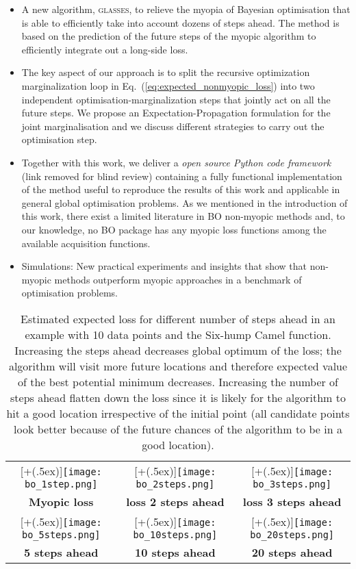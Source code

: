 \documentclass[twoside]{article}
\newcommand{\acr}[1]{\textsc{#1}\xspace}
\newcommand{\us}{\acr{glasses}}
\newcommand*{\addheight}[2][.5ex]{%
  \raisebox{0pt}[\dimexpr\height+(#1)\relax]{#2}%
}
\begin{document}
\begin{itemize}
\item A new algorithm, \us, to relieve the myopia of Bayesian optimisation that is able to efficiently take into account dozens of steps ahead. The method is based on the prediction of the future steps of the myopic algorithm to efficiently integrate out a long-side loss. 
\item The key aspect of our approach is to split the recursive optimization marginalization loop in Eq.~(\ref{eq:expected_nonmyopic_loss}) into two independent optimisation-marginalization steps that jointly act on all the future steps. We propose an Expectation-Propagation formulation for the joint marginalisation and we discuss different strategies to carry out the optimisation step.
\item Together with this work, we deliver a \emph{open source Python code framework} (link removed for blind review) containing a fully functional  implementation of the method useful to reproduce the results of this work and applicable in general global optimisation problems. As we mentioned in the introduction of this work, there exist a limited literature in BO non-myopic methods and, to our knowledge, no BO package has any myopic loss functions among the available acquisition functions. 
\item Simulations: New practical experiments and insights that show that non-myopic methods outperform myopic approaches in a benchmark of optimisation problems. 
\end{itemize}



\begin{table*}[t!]
\begin{tabular}{ccc}
      \addheight{\texttt{[image: bo\_1step.png]}} &
      \addheight{\texttt{[image: bo\_2steps.png]}}  &
      \addheight{\texttt{[image: bo\_3steps.png]}}\\
      \small \textbf{Myopic loss} &  \small \textbf{loss 2 steps ahead} & \small \textbf{loss 3 steps ahead} \\
      \addheight{\texttt{[image: bo\_5steps.png]}} &
      \addheight{\texttt{[image: bo\_10steps.png]}}  &
      \addheight{\texttt{[image: bo\_20steps.png]}}\\
      \small \small \textbf{5 steps ahead} & \small \textbf{10 steps ahead} & \small \textbf{20 steps ahead} \\
\end{tabular}\caption{Estimated expected loss for different number of steps ahead in an example with 10 data points and the Six-hump Camel function. Increasing the steps ahead decreases global optimum of the loss; the algorithm will visit more future locations and therefore expected value of the best potential minimum decreases. Increasing the number of steps ahead flatten down the loss since it is likely for the algorithm to hit a good location irrespective of the initial point (all candidate points look better because of the future chances of the algorithm to be in a good location).}
\end{table*}
\end{document}
